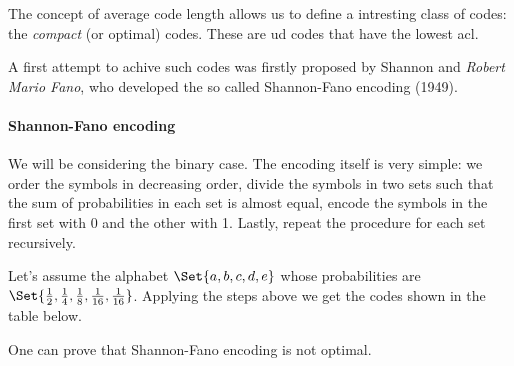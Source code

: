 \documentclass{subfiles}
\begin{document}
    The concept of average code length allows us to define a intresting class of 
        codes: the \emph{compact} (or optimal) codes.
        These are \gls{ud} codes that have the lowest \gls{acl}.
    
    A first attempt to achive such codes was firstly proposed by Shannon 
        and \emph{Robert Mario Fano}, who developed the so called Shannon-Fano 
        encoding (1949).

    \paragraph{Shannon-Fano encoding}
    We will be considering the binary case. 
    The encoding itself is very simple: we order the symbols in decreasing order,
    divide the symbols in two sets such that the sum of probabilities in each set 
    is almost equal, encode the symbols in the first set with 0 and the other with 1.
    Lastly, repeat the procedure for each set recursively.
    \begin{example*}
        Let's assume the alphabet \(\Set{a, b, c, d, e}\) whose probabilities are
            \(\Set{\tfrac{1}{2}, \tfrac{1}{4}, \tfrac{1}{8},
                \tfrac{1}{16}, \tfrac{1}{16}}\). 
            Applying the steps above we get the codes shown in the table below. 
            
    \end{example*}
    One can prove that Shannon-Fano encoding is not optimal.
    \clearpage
\end{document}
